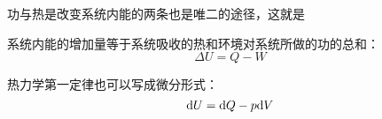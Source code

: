             功与热是改变系统内能的两条也是唯二的途径，这就是\linebreak
            \begin{law}
                系统内能的增加量等于系统吸收的热和环境对系统所做的功的总和：
                \begin{equation}
                    \Delta U = Q - W
                    \nonumber
                \end{equation}
            \end{law}
            热力学第一定律也可以写成微分形式：
            \begin{equation}
                \mathrm{d}{U} = \mathrm{d}{Q} - p\mathrm{d}{V}
                \nonumber
            \end{equation}
        \subsection[过程介绍]{}
